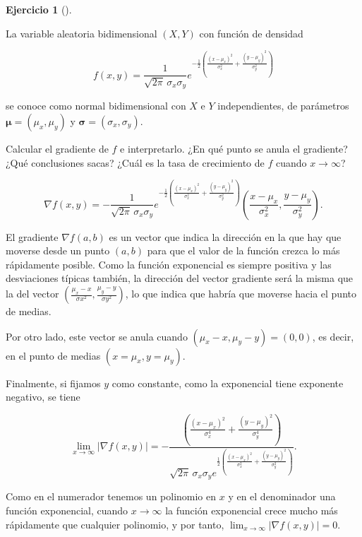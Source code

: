 \documentclass[
  spanish,
  a4paper,
]{scrreport}
\theoremstyle{definition}
\newtheorem{exercise}{Ejercicio}[chapter]
\theoremstyle{remark}
\begin{document}
\begin{exercise}[]\protect\hypertarget{exr-normal-bidimensional}{}\label{exr-normal-bidimensional}

La variable aleatoria bidimensional \((X,Y)\) con función de densidad

\[
f(x,y) = \frac{1}{\sqrt{2\pi}\, \sigma_x\sigma_y} e^{-\frac{1}{2}\left(\frac{(x-\mu_x)^2}{\sigma_x^2}+\frac{(y-\mu_y)^2}{\sigma_y^2}\right)}
\]

se conoce como normal bidimensional con \(X\) e \(Y\) independientes, de
parámetros \(\mathbf{\mu}=(\mu_x,\mu_y)\) y
\(\mathbf{\sigma}=(\sigma_x,\sigma_y)\).

Calcular el gradiente de \(f\) e interpretarlo. ¿En qué punto se anula
el gradiente? ¿Qué conclusiones sacas? ¿Cuál es la tasa de crecimiento
de \(f\) cuando \(x\rightarrow \infty\)?

\end{exercise}

\begin{tcolorbox}[enhanced jigsaw, arc=.35mm, bottomrule=.15mm, bottomtitle=1mm, breakable, colback=white, colbacktitle=quarto-callout-tip-color!10!white, colframe=quarto-callout-tip-color-frame, coltitle=black, left=2mm, leftrule=.75mm, opacityback=0, opacitybacktitle=0.6, rightrule=.15mm, title=\textcolor{quarto-callout-tip-color}{\faLightbulb}\hspace{0.5em}{Solución}, titlerule=0mm, toprule=.15mm, toptitle=1mm]

\[
\nabla f(x,y) = -\frac{1}{\sqrt{2\pi}\, \sigma_x\sigma_y} e^{-\frac{1}{2}\left(\frac{(x-\mu_x)^2}{\sigma_x^2}+\frac{(y-\mu_y)^2}{\sigma_y^2}\right)} \left(\frac{x-\mu_x}{\sigma_x^2}, \frac{y-\mu_y}{\sigma_y^2}\right).
\]

El gradiente \(\nabla f(a,b)\) es un vector que indica la dirección en
la que hay que moverse desde un punto \((a,b)\) para que el valor de la
función crezca lo más rápidamente posible. Como la función exponencial
es siempre positiva y las desviaciones típicas también, la dirección del
vector gradiente será la misma que la del vector
\((\frac{\mu_x-x}{\sigma x^2}, \frac{\mu_y-y}{\sigma y^2})\), lo que
indica que habría que moverse hacia el punto de medias.

Por otro lado, este vector se anula cuando \((\mu_x-x, \mu_y-y)=(0,0)\),
es decir, en el punto de medias \((x=\mu_x, y=\mu_y)\).

Finalmente, si fijamos \(y\) como constante, como la exponencial tiene
exponente negativo, se tiene

\[
\lim_{x\to \infty} |\nabla f(x,y)| 
= -\frac{\left(\frac{(x-\mu_x)^2}{\sigma_x^4} + \frac{(y-\mu_y)^2}{\sigma_y^4}\right)}{\sqrt{2\pi}\, \sigma_x\sigma_y e^{\frac{1}{2}\left(\frac{(x-\mu_x)^2}{\sigma_x^2}+\frac{(y-\mu_y)^2}{\sigma_y^2}\right)}}.
\]

Como en el numerador tenemos un polinomio en \(x\) y en el denominador
una función exponencial, cuando \(x\to \infty\) la función exponencial
crece mucho más rápidamente que cualquier polinomio, y por tanto,
\(\lim_{x\to \infty} |\nabla f(x,y)| = 0\).

\end{tcolorbox}
\end{document}
